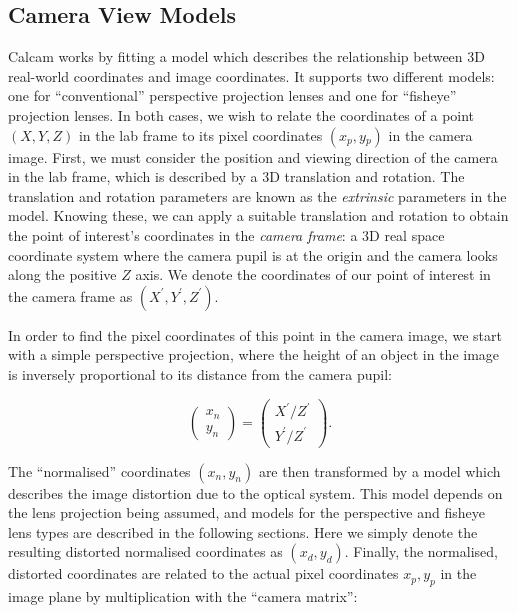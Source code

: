 \documentclass[12pt]{article}
\begin{document}
\subsection{Camera View Models}
Calcam works by fitting a model which describes the relationship between 3D real-world coordinates and image coordinates. It supports two different models: one for ``conventional'' perspective projection lenses and one for ``fisheye'' projection lenses. In both cases, we wish to relate the coordinates of a point $(X,Y,Z)$ in the lab frame to its pixel coordinates $(x{_p},y{_p})$ in the camera image. First, we must consider the position and viewing direction of the camera in the lab frame, which is described by a 3D translation and rotation. The translation and rotation parameters are known as the {\it extrinsic} parameters in the model.  Knowing these, we can apply a suitable translation and rotation to obtain the point of interest's coordinates in the {\it camera frame}: a 3D real space coordinate system where the camera pupil is at the origin and the camera looks along the positive $Z$ axis. We denote the coordinates of our point of interest in the camera frame as $(X^\prime,Y^\prime,Z^\prime)$. 

In order to find the pixel coordinates of this point in the camera image, we start with a simple perspective projection, where the height of an object in the image is inversely proportional to its distance from the camera pupil:

\begin{equation}
\begin{pmatrix}x_n\\y_n\end{pmatrix} = \begin{pmatrix}X^\prime/Z^\prime\\Y^\prime/Z^\prime\end{pmatrix}.
\label{eqn:cmmodel_pinhole}
\end{equation}

\noindent The ``normalised'' coordinates $(x_n,y_n)$ are then transformed by a model which describes the image distortion due to the optical system. This model depends on the lens projection being assumed, and models for the perspective and fisheye lens types are described in the following sections. Here we simply denote the resulting distorted normalised coordinates as $(x_d, y_d)$. Finally, the normalised, distorted coordinates are related to the actual pixel coordinates $x_p, y_p$ in the image plane by multiplication with the ``camera matrix'':
\end{document}
